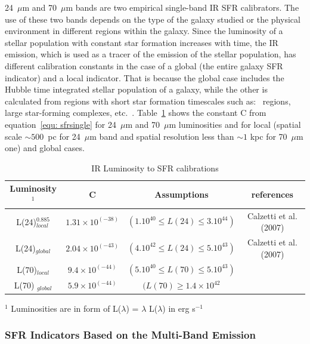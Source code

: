 24~$\mu$m and 70~$\mu$m bands are two empirical single-band IR SFR calibrators. 
The use of these two bands depends on the type of the galaxy studied or the physical environment in different regions within the galaxy. 
Since the luminosity of a stellar population with constant star formation increases with time, the IR emission, which is used as a tracer of the emission of the stellar population, has different calibration constants in the case of a global (the entire galaxy SFR indicator) and a local indicator.
That is because the global case includes the Hubble time integrated stellar population of a galaxy, while the other is calculated from regions with short star formation timescales such as: \hii~regions, large star-forming complexes, etc.~\cite{Calzetti13}. 
Table~\ref{table2} shows the constant C from equation~\ref{equ: sfrsingle} for 24~$\mu$m and 70~$\mu$m luminosities and for local (spatial scale $\sim500$~pc for 24~$\mu$m band and spatial resolution less than $\sim 1$ kpc for 70~$\mu$m one) and global cases. 

\begin{table}
\centering
\caption{IR Luminosity to SFR calibrations}
\label{table2}
\begin{tabular}{ c c c c }
\hline\hline
Luminosity$^1$ & C & Assumptions & references\\
\hline
L(24)$^{0.885}_{local}$ & $1.31 \times 10^{(-38)}$ &$(1.10^{40} \le L(24) \le 3.10^{44})$& Calzetti et al. (2007)  \\
L(24)$_{global}$ & $2.04 \times 10^{(-43)}$ &$ (4.10^{42} \le L(24)  \le 5.10^{43})$& Calzetti et al. (2007) \\
L(70)$_{local}$ & $9.4 \times 10^{(-44)} $ &$(5.10^{40} \le  L(70) \le 5.10^{43})$& \cite{Li12} \\
L(70) $_{global}$& $5.9 \times 10^{(-44)}$ &$(L(70) \ge 1.4 \times 10^{42} $& \cite{Li10}\\
\hline
\end{tabular}
\begin{tablenotes}
\item $^1$ Luminosities are in form of L($\lambda$) = $\lambda$ L($\lambda$) in erg s$^{-1}$
\end{tablenotes}
\end{table}  

\subsubsection*{SFR Indicators Based on the Multi-Band Emission}

